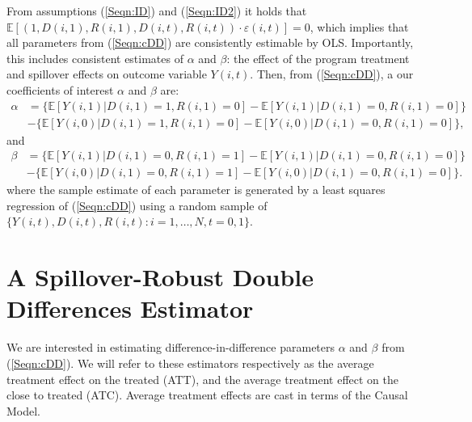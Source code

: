 \documentclass{article}
\begin{document}
\begin{spacing}{1.1}
From assumptions (\ref{Seqn:ID}) and (\ref{Seqn:ID2}) it holds that $\mathbb{E}[(1,D(i,1),R(i,1),
D(i,t),R(i,t))\cdot\varepsilon(i,t)]=0$, which implies that all parameters from
(\ref{Seqn:cDD}) are consistently estimable by OLS.  Importantly, this includes
consistent estimates of $\alpha$ and $\beta$: the effect of the program treatment 
and spillover effects on outcome variable $Y(i,t)$.  Then, from (\ref{Seqn:cDD}),
a our coefficients of interest $\alpha$ and $\beta$ are:
\begin{equation}
\nonumber
\label{Seqn:DDa}
\begin{split}
\alpha&=\{\mathbb{E}[Y(i,1)|D(i,1)=1,R(i,1)=0]-\mathbb{E}[Y(i,1)|D(i,1)=0,R(i,1)=0]\} \\
      &-\{\mathbb{E}[Y(i,0)|D(i,1)=1,R(i,1)=0]-\mathbb{E}[Y(i,0)|D(i,1)=0,R(i,1)=0]\}, 
\end{split}
\end{equation}
and 
\begin{equation}
\nonumber
\label{Seqn:DDb}
\begin{split}
\beta&=\{\mathbb{E}[Y(i,1)|D(i,1)=0,R(i,1)=1]-\mathbb{E}[Y(i,1)|D(i,1)=0,R(i,1)=0]\} \\
      &-\{\mathbb{E}[Y(i,0)|D(i,1)=0,R(i,1)=1]-\mathbb{E}[Y(i,0)|D(i,1)=0,R(i,1)=0]\}. 
\end{split}
\end{equation}
where the sample estimate of each parameter is generated by a least squares
regression of (\ref{Seqn:cDD}) using a random sample of 
$\{Y(i,t), D(i,t), R(i,t): i=1, \ldots, N, t=0, 1\}$.

\section{A Spillover-Robust Double Differences Estimator}
\label{Sscn:estim}
We are interested in estimating difference-in-difference parameters $\alpha$ and 
$\beta$ from (\ref{Seqn:cDD}).  We will refer to these estimators respectively
as the average treatment effect on the treated (ATT), and the average treatment
effect on the close to treated (ATC).  Average treatment effects are cast in 
terms of the \citet{Rubin1974} Causal Model.


\end{spacing}
\end{document}
